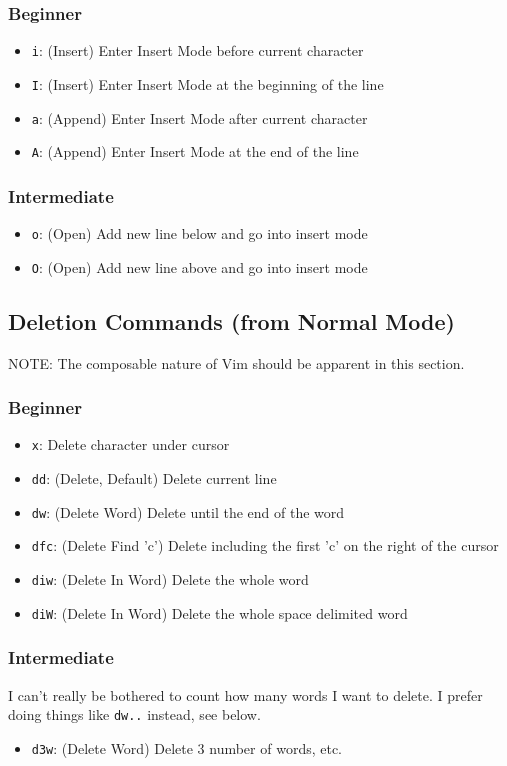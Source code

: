 \documentclass[11pt]{article}
\begin{document}
\subsubsection{Beginner}
\label{sec:org0c728c1}
\begin{itemize}
\item \texttt{i}: (Insert) Enter Insert Mode before current character
\item \texttt{I}: (Insert) Enter Insert Mode at the beginning of the line
\item \texttt{a}: (Append) Enter Insert Mode after current character
\item \texttt{A}: (Append) Enter Insert Mode at the end of the line
\end{itemize}
\subsubsection{Intermediate}
\label{sec:org9ae1ba6}
\begin{itemize}
\item \texttt{o}: (Open) Add new line below and go into insert mode
\item \texttt{O}: (Open) Add new line above and go into insert mode
\end{itemize}
\subsection{Deletion Commands (from Normal Mode)}
\label{sec:org49cdd02}
NOTE: The composable nature of Vim should be apparent in this section.
\subsubsection{Beginner}
\label{sec:org0524037}
\begin{itemize}
\item \texttt{x}: Delete character under cursor
\item \texttt{dd}: (Delete, Default) Delete current line
\item \texttt{dw}: (Delete Word) Delete until the end of the word
\item \texttt{dfc}: (Delete Find 'c') Delete including the first 'c' on the right of the cursor
\item \texttt{diw}: (Delete In Word) Delete the whole word
\item \texttt{diW}: (Delete In Word) Delete the whole space delimited word
\end{itemize}
\subsubsection{Intermediate}
\label{sec:orgb2859b6}
I can't really be bothered to count how many words I want to delete. I prefer
doing things like \texttt{dw..} instead, see below.
\begin{itemize}
\item \texttt{d3w}: (Delete Word) Delete 3 number of words, etc.
\end{itemize}
\end{document}
